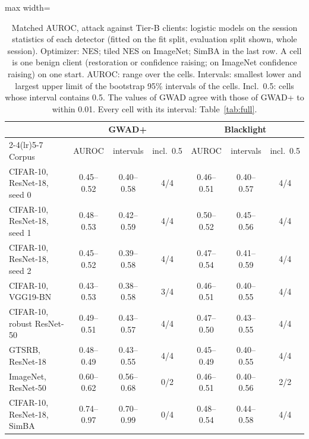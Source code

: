 \begin{table}[!tbp]
\centering\footnotesize\setlength{\tabcolsep}{4pt}
\caption{Matched AUROC, attack against Tier-B clients: logistic models on the session statistics of each detector (fitted on the fit split, evaluation split shown, whole session). Optimizer: NES; tiled NES on ImageNet; SimBA in the last row. A cell is one benign client (restoration or confidence raising; on ImageNet confidence raising) on one start. AUROC: range over the cells. Intervals: smallest lower and largest upper limit of the bootstrap 95\% intervals of the cells. Incl.\ 0.5: cells whose interval contains 0.5. The values of GWAD agree with those of GWAD+ to within 0.01. Every cell with its interval: Table~\ref{tab:full}.}
\label{tab:main-matched}
\vspace{3pt}
\begin{adjustbox}{max width=\textwidth}
\begin{tabular}{lcccccc}
\toprule
& \multicolumn{3}{c}{GWAD+} & \multicolumn{3}{c}{Blacklight} \\
\cmidrule(lr){2-4}\cmidrule(lr){5-7}
Corpus & AUROC & intervals & incl.\ 0.5 & AUROC & intervals & incl.\ 0.5 \\
\midrule
CIFAR-10, ResNet-18, seed 0 & 0.45--0.52 & 0.40--0.58 & 4/4 & 0.46--0.51 & 0.40--0.57 & 4/4 \\
CIFAR-10, ResNet-18, seed 1 & 0.48--0.53 & 0.42--0.59 & 4/4 & 0.50--0.52 & 0.45--0.56 & 4/4 \\
CIFAR-10, ResNet-18, seed 2 & 0.45--0.52 & 0.39--0.58 & 4/4 & 0.47--0.54 & 0.41--0.59 & 4/4 \\
CIFAR-10, VGG19-BN & 0.43--0.53 & 0.38--0.58 & 3/4 & 0.46--0.51 & 0.40--0.55 & 4/4 \\
CIFAR-10, robust ResNet-50 & 0.49--0.51 & 0.43--0.57 & 4/4 & 0.47--0.50 & 0.43--0.55 & 4/4 \\
GTSRB, ResNet-18 & 0.48--0.49 & 0.43--0.55 & 4/4 & 0.45--0.49 & 0.40--0.55 & 4/4 \\
ImageNet, ResNet-50 & 0.60--0.62 & 0.56--0.68 & 0/2 & 0.46--0.51 & 0.40--0.56 & 2/2 \\
CIFAR-10, ResNet-18, SimBA & 0.74--0.97 & 0.70--0.99 & 0/4 & 0.48--0.54 & 0.44--0.58 & 4/4 \\
\bottomrule
\end{tabular}
\end{adjustbox}
\end{table}
